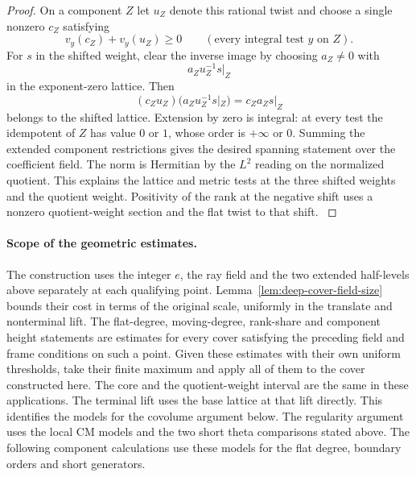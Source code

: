 \begin{proof}
On a component \(Z\) let \(u_Z\) denote this rational
twist and choose a single nonzero \(c_Z\) satisfying
\[
 v_y(c_Z)+v_y(u_Z)\ge0\qquad(\text{every integral test }y\text{ on } Z).
\]
For \(s\) in the shifted weight, clear
the inverse image by choosing \(a_Z\ne0\) with
\[
 a_Zu_Z^{-1}s|_Z
\]
in the exponent-zero lattice. Then
\[
 (c_Zu_Z)\bigl(a_Zu_Z^{-1}s|_Z\bigr)=c_Za_Zs|_Z
\]
belongs to the shifted lattice. Extension by zero is
integral: at every test the idempotent of \(Z\) has value
\(0\) or \(1\), whose order is \(+\infty\) or \(0\).
Summing the extended component restrictions gives the
desired spanning statement over the coefficient field. The norm is Hermitian by the \(L^2\) reading on
the normalized quotient. This explains the lattice and
metric tests at the three shifted weights and the
quotient weight. Positivity of the rank at the negative
shift uses a nonzero quotient-weight section and the flat
twist to that shift.
\label{cor:deep-cover-on-core-10}

\end{proof}

\paragraph{Scope of the geometric estimates.}
The construction uses the integer \(e\), the ray field and the
two extended half-levels above separately at each qualifying
point. Lemma~\ref{lem:deep-cover-field-size} bounds their cost
in terms of the original scale, uniformly in the translate and
nonterminal lift. The flat-degree, moving-degree, rank-share and component
height statements are estimates for every cover satisfying
the preceding field and frame conditions on such a point.
Given these estimates with their own uniform thresholds,
take their finite maximum and apply all of them to the cover
constructed here. The core and the quotient-weight interval
are the same in these applications. The terminal lift
uses the base lattice at that lift directly. This
identifies the models for the covolume argument below.
The regularity argument uses the local CM models and
the two short theta comparisons stated above. The following component calculations use these models for
the flat degree, boundary orders and short generators.
\label{cor:deep-cover-on-core-11}
